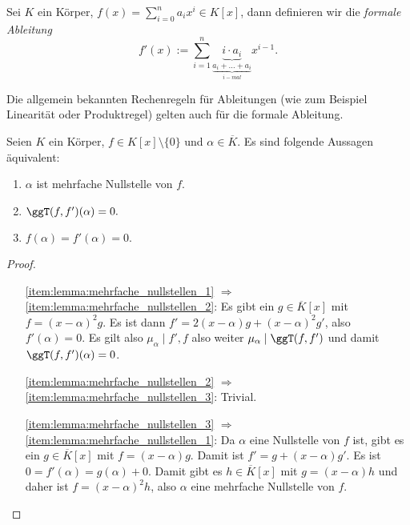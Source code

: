 \begin{definition}
    Sei $K$ ein Körper, $f(x) = \sum_{i=0}^n a_i x^i \in K[x]$, dann definieren wir die \emph{formale Ableitung}
    $$ f'(x) := \sum_{i=1}^n \underbrace{i\cdot a_i}_{\underbrace{a_i + \ldots + a_i}_{i-mal}} x^{i-1}. $$
\end{definition}
\begin{remark}
    Die allgemein bekannten Rechenregeln für Ableitungen (wie zum Beispiel Linearität oder Produktregel) gelten auch für die formale Ableitung.
\end{remark}

\begin{lemma}\label{lemma:mehrfache_nullstellen}
    Seien $K$ ein Körper, $f \in K[x]\setminus\{0\}$ und $\alpha \in \overline{K}$. Es sind folgende Aussagen äquivalent:
    \begin{enumerate}
        \item \label{item:lemma:mehrfache_nullstellen_1}$\alpha$ ist mehrfache Nullstelle von $f$.
        \item \label{item:lemma:mehrfache_nullstellen_2}$\ggT(f, f')(\alpha) = 0.$
        \item \label{item:lemma:mehrfache_nullstellen_3}$f(\alpha)=f'(\alpha)=0.$
    \end{enumerate}
\end{lemma}

\begin{proof}{\ }
    \begin{enumerate} 
        \item[\ref*{item:lemma:mehrfache_nullstellen_1} $\Rightarrow$ \ref*{item:lemma:mehrfache_nullstellen_2}:] Es gibt ein $g \in \overline{K}[x]$ mit $f = (x-\alpha)^2 g$. Es ist dann $f' = 2(x-\alpha)g + (x-\alpha)^2g'$, also $f'(\alpha) = 0$. Es gilt also $\mu_\alpha \mid f', f$ also weiter $\mu_\alpha \mid \ggT(f, f')$ und damit $\ggT(f, f')(\alpha) = 0$. 

        \item[\ref*{item:lemma:mehrfache_nullstellen_2} $\Rightarrow$ \ref*{item:lemma:mehrfache_nullstellen_3}:] Trivial.
         
        \item[\ref*{item:lemma:mehrfache_nullstellen_3} $\Rightarrow$ \ref*{item:lemma:mehrfache_nullstellen_1}:] Da $\alpha$ eine Nullstelle von $f$ ist, gibt es ein $g \in \overline{K}[x]$ mit $f = (x-\alpha)g$. Damit ist $f' = g + (x-\alpha)g'$. Es ist $0 = f'(\alpha) = g(\alpha) + 0$. Damit gibt es $h \in \overline{K}[x]$ mit $g = (x-\alpha)h$ und daher ist $f = (x-\alpha)^2h$, also $\alpha$ eine mehrfache Nullstelle von $f$.
    \end{enumerate}
\end{proof}

